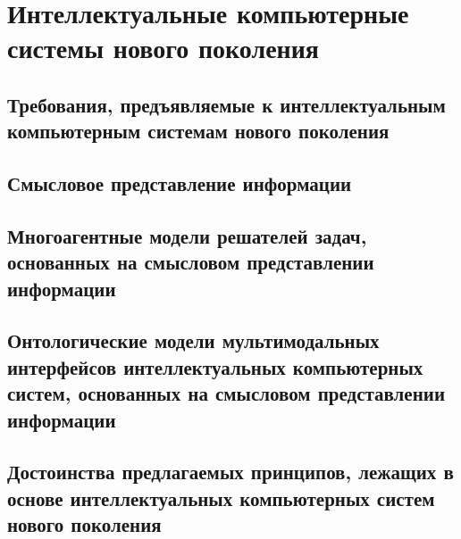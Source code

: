 \chapter{Интеллектуальные компьютерные системы нового поколения}
\label{chapter_new_generation_systems} 


\section{Требования, предъявляемые к интеллектуальным компьютерным системам нового поколения}
\section{Смысловое представление информации}
\section{Многоагентные модели решателей задач, основанных на смысловом представлении информации}
\section{Онтологические модели мультимодальных интерфейсов интеллектуальных компьютерных систем, основанных на смысловом представлении информации}
\section{Достоинства предлагаемых принципов, лежащих в основе интеллектуальных компьютерных систем нового поколения}

%